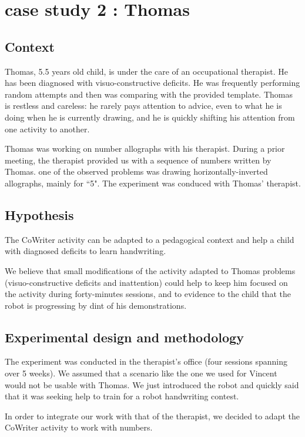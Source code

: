\documentclass[conference]{IEEEtran}
\begin{document}
\section{case study 2 : Thomas}\label{Thomas}

\subsection{Context}

Thomas, 5.5 years old child, is under the care of an occupational
therapist. He has been diagnosed with visuo-constructive deficits.
He was frequently performing random attempts and then was comparing
with the provided template. Thomas is restless and careless: he
rarely pays attention to
advice, even to what he is doing when he is currently drawing, and he is
quickly shifting his attention from one activity to another.

Thomas was working on number allographs with his therapist. During a prior
meeting, the therapist provided us with a sequence of numbers
written by Thomas. one of the observed problems was drawing
horizontally-inverted allographs, mainly for ``5". The experiment was conduced with Thomas' therapist. 

\subsection{Hypothesis}

The CoWriter activity can be adapted to a pedagogical context and help a child with diagnosed deficits to learn handwriting. 

We believe that small modifications of the activity adapted to
Thomas problems (visuo-constructive deficits and inattention) could help to
keep him focused on the activity during forty-minutes sessions, and to evidence to the child that the robot is progressing by dint of his demonstrations. 

\subsection{Experimental design and methodology}
The experiment was conducted in the therapist's office (four sessions 
spanning over 5 weeks). We assumed that a scenario like the one we used 
for Vincent would not be usable with Thomas. We just introduced the robot 
and quickly said that it was seeking help to train for a robot handwriting contest.

In order to integrate our work with that of the therapist, we decided to adapt the 
CoWriter activity to work with numbers.
\end{document}
